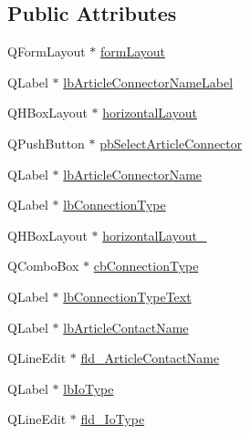 \subsection*{Public Attributes}
\begin{DoxyCompactItemize}
\item 
Q\-Form\-Layout $\ast$ \hyperlink{class_ui__mdt_cl_article_connection_dialog_a8528bb95adef5853fd3d40894f310721}{form\-Layout}
\item 
Q\-Label $\ast$ \hyperlink{class_ui__mdt_cl_article_connection_dialog_a0ae659538ae53bcd35d807183e6aad0d}{lb\-Article\-Connector\-Name\-Label}
\item 
Q\-H\-Box\-Layout $\ast$ \hyperlink{class_ui__mdt_cl_article_connection_dialog_adbdc30dbd1114ba069f1f22dcc3188e8}{horizontal\-Layout}
\item 
Q\-Push\-Button $\ast$ \hyperlink{class_ui__mdt_cl_article_connection_dialog_a4faf314284efe49f2c26bd1dba38cf05}{pb\-Select\-Article\-Connector}
\item 
Q\-Label $\ast$ \hyperlink{class_ui__mdt_cl_article_connection_dialog_aeed8bbddc15fd018b49c56b0b52620ef}{lb\-Article\-Connector\-Name}
\item 
Q\-Label $\ast$ \hyperlink{class_ui__mdt_cl_article_connection_dialog_a195d87b2dea6e827f9a942c385f1f295}{lb\-Connection\-Type}
\item 
Q\-H\-Box\-Layout $\ast$ \hyperlink{class_ui__mdt_cl_article_connection_dialog_a69146660ffaf8b0a7d95415ba881b65c}{horizontal\-Layout\-\_}
\item 
Q\-Combo\-Box $\ast$ \hyperlink{class_ui__mdt_cl_article_connection_dialog_a58ec113ad5d3de7e47cdd8e2124563ca}{cb\-Connection\-Type}
\item 
Q\-Label $\ast$ \hyperlink{class_ui__mdt_cl_article_connection_dialog_a8be4af6e453f508aa47d5d54c8feecb6}{lb\-Connection\-Type\-Text}
\item 
Q\-Label $\ast$ \hyperlink{class_ui__mdt_cl_article_connection_dialog_a25772986f5e1ad1c6d1e80c9fcba13ee}{lb\-Article\-Contact\-Name}
\item 
Q\-Line\-Edit $\ast$ \hyperlink{class_ui__mdt_cl_article_connection_dialog_aa870a49559d95f051a8e2f70d0577472}{fld\-\_\-\-Article\-Contact\-Name}
\item 
Q\-Label $\ast$ \hyperlink{class_ui__mdt_cl_article_connection_dialog_a092df073f3829e7d3250627b817a49e6}{lb\-Io\-Type}
\item 
Q\-Line\-Edit $\ast$ \hyperlink{class_ui__mdt_cl_article_connection_dialog_a79841a2082844f23a41e0dcb6bf42e4e}{fld\-\_\-\-Io\-Type}

\end{DoxyCompactItemize}
